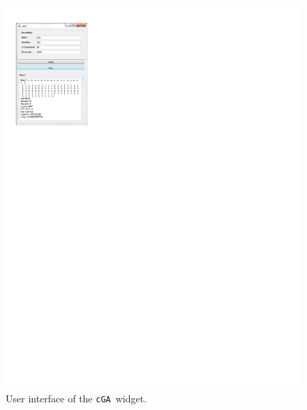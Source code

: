 \documentclass{sig-alternate}
\newcommand{\cGA}{\texttt{cGA}}
\begin{document}
\begin{figure}[H]
	\centering
	\includegraphics[scale=1.12]{cga_run} 
	\caption{User interface of the \cGA~widget.}
	\label{fig:cga_run}
\end{figure}
\end{document}
